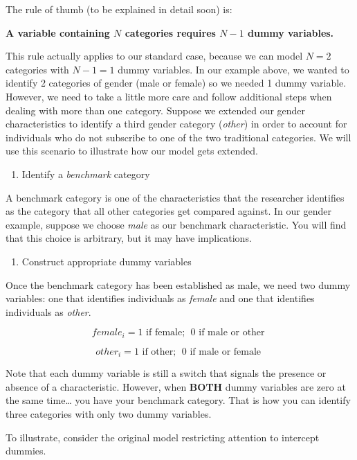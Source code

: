 \documentclass[
]{book}
\providecommand{\tightlist}{%
  \setlength{\itemsep}{0pt}\setlength{\parskip}{0pt}}
\begin{document}
The rule of thumb (to be explained in detail soon) is:

\textbf{A variable containing \(N\) categories requires \(N-1\) dummy variables.}

This rule actually applies to our standard case, because we can model \(N=2\) categories with \(N-1=1\) dummy variables. In our example above, we wanted to identify 2 categories of gender (male or female) so we needed 1 dummy variable. However, we need to take a little more care and follow additional steps when dealing with more than one category. Suppose we extended our gender characteristics to identify a third gender category (\emph{other}) in order to account for individuals who do not subscribe to one of the two traditional categories. We will use this scenario to illustrate how our model gets extended.

\begin{enumerate}
\def\labelenumi{\arabic{enumi}.}
\tightlist
\item
  Identify a \emph{benchmark} category
\end{enumerate}

A benchmark category is one of the characteristics that the researcher identifies as the category that all other categories get compared against. In our gender example, suppose we choose \emph{male} as our benchmark characteristic. You will find that this choice is arbitrary, but it may have implications.

\begin{enumerate}
\def\labelenumi{\arabic{enumi}.}
\setcounter{enumi}{1}
\tightlist
\item
  Construct appropriate dummy variables
\end{enumerate}

Once the benchmark category has been established as male, we need two dummy variables: one that identifies individuals as \emph{female} and one that identifies individuals as \emph{other}.

\[female_i = 1 \mbox{ if female; }\; 0 \mbox{ if male or other }\]

\[other_i = 1 \mbox{ if other; }\;  0 \mbox{ if male or female }\]

Note that each dummy variable is still a switch that signals the presence or absence of a characteristic. However, when \textbf{BOTH} dummy variables are zero at the same time\ldots{} you have your benchmark category. That is how you can identify three categories with only two dummy variables.

To illustrate, consider the original model restricting attention to intercept dummies.
\end{document}
